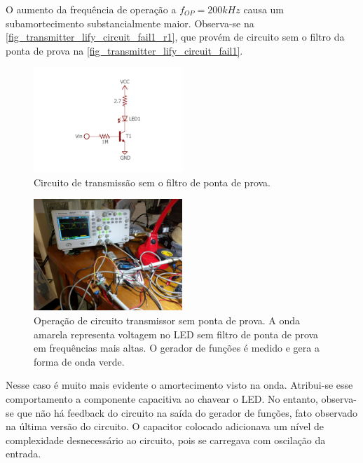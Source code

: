 	O aumento da frequência de operação a $f_{OP} = 200kHz$ causa um subamortecimento substancialmente maior. Observa-se na \autoref{fig_transmitter_lify_circuit_fail1_r1}, que provém de circuito sem o filtro da ponta de prova na \autoref{fig_transmitter_lify_circuit_fail1}.
	\begin{figure}[htb]
		\caption{\label{fig_transmitter_lify_circuit_fail1} Circuito de transmissão sem o filtro de ponta de prova.}
		\centering		%
		\includegraphics[width=0.5\textwidth, trim={2cm 1.5cm 2cm 2cm}, clip]{circuits/transmitter_fail1.pdf}
	\end{figure}
	
	\begin{figure}[htb]
		\caption{\label{fig_transmitter_lify_circuit_fail1_r1} Operação de circuito transmissor sem ponta de prova. A onda amarela representa voltagem no LED sem filtro de ponta de prova em frequências mais altas. O gerador de funções é medido e gera a forma de onda verde.}
		\centering		%
		\includegraphics[width=0.5\textwidth, trim={20cm 65cm 85cm 10cm}, clip]{circuits/photos/TX_200k_without_filter.jpg}
	\end{figure}
	Nesse caso é muito mais evidente o amortecimento visto na onda. Atribui-se esse comportamento a componente capacitiva ao chavear o LED. No entanto, observa-se que não há feedback do circuito na saída do gerador de funções, fato observado na última versão do circuito. O capacitor colocado adicionava um nível de complexidade desnecessário ao circuito, pois se carregava com oscilação da entrada. 
	
